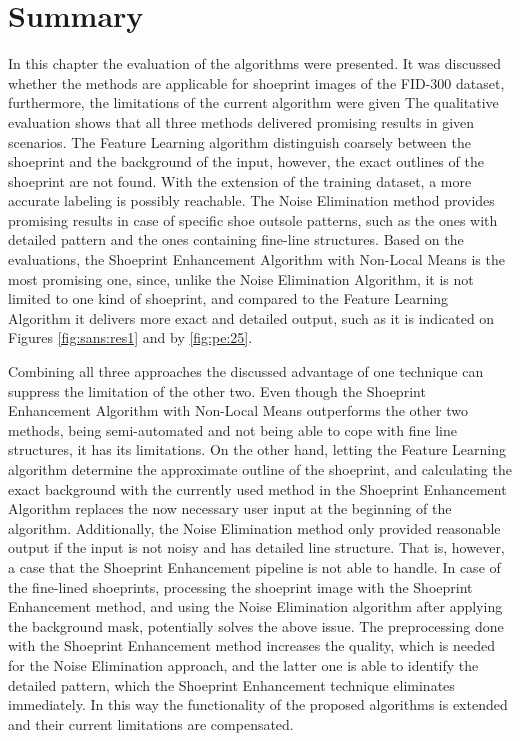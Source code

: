 \documentclass[draft,final]{vutinfth} %
\begin{document}
\section{Summary}
\par
In this chapter the evaluation of the algorithms were presented.
It was discussed whether the methods are applicable for shoeprint images of the FID-300 dataset, furthermore, the limitations of the current algorithm were given
The qualitative evaluation shows that all three methods delivered promising results in given scenarios.
The Feature Learning algorithm distinguish coarsely between the shoeprint and the background of the input, however, the exact outlines of the shoeprint are not found. 
With the extension of the training dataset, a more accurate labeling is possibly reachable.
The Noise Elimination method provides promising results in case of specific shoe outsole patterns, such as the ones with detailed pattern and the ones containing fine-line structures.
Based on the evaluations, the Shoeprint Enhancement Algorithm with Non-Local Means is the most promising one, since, unlike the Noise Elimination Algorithm, it is not limited to one kind of shoeprint, and compared to the Feature Learning Algorithm it delivers more exact and detailed output, such as it is indicated on Figures \ref{fig:sans:res1} and by \ref{fig:pe:25}.
\par
Combining all three approaches the discussed advantage of one technique can suppress the limitation of the other two.
Even though the Shoeprint Enhancement Algorithm with Non-Local Means outperforms the other two methods, being semi-automated and not being able to cope with fine line structures, it has its limitations. 
On the other hand, letting the Feature Learning algorithm determine the approximate outline of the shoeprint, and calculating the exact background with the currently used method in the Shoeprint Enhancement Algorithm replaces the now necessary user input at the beginning of the algorithm.
Additionally, the Noise Elimination method only provided reasonable output if the input is not noisy and has detailed line structure.
That is, however, a case that the Shoeprint Enhancement pipeline is not able to handle. 
In case of the fine-lined shoeprints, processing the shoeprint image with the Shoeprint Enhancement method, and using the Noise Elimination algorithm after applying the background mask, potentially solves the above issue.
The preprocessing done with the Shoeprint Enhancement method increases the quality, which is needed for the Noise Elimination approach, and the latter one is able to identify the detailed pattern, which the Shoeprint Enhancement technique eliminates immediately.
In this way the functionality of the proposed algorithms is extended and their current limitations are compensated.
\end{document}
